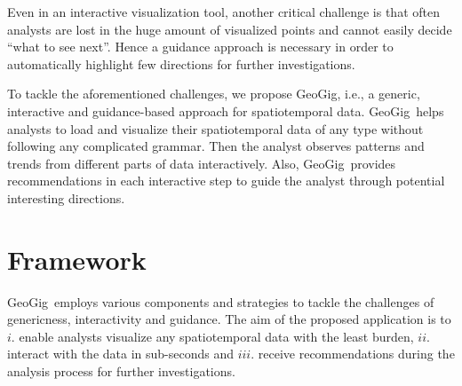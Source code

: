 \documentclass[conference]{IEEEtran}
\newcommand{\sys}{{\sc GeoGig}}
\begin{document}
 Even in an interactive visualization tool, another critical challenge is that often analysts are lost in the huge amount of visualized points and cannot easily decide ``what to see next''. Hence a guidance approach is necessary in order to automatically highlight few directions for further investigations.

To tackle the aforementioned challenges, we propose \sys, i.e., a generic, interactive and guidance-based approach for spatiotemporal data. \sys\ helps analysts to load and visualize their spatiotemporal data of any type without following any complicated grammar. Then the analyst observes patterns and trends from different parts of data interactively. Also, \sys\ provides recommendations in each interactive step to guide the analyst through potential interesting directions.



\vspace{-5pt}
\section{Framework}
\sys\ employs various components and strategies to tackle the challenges of genericness, interactivity and guidance. The aim of the proposed application is to $i.$ enable analysts visualize any spatiotemporal data with the least burden, $ii.$ interact with the data in sub-seconds and $iii.$ receive recommendations during the analysis process for further investigations.
\end{document}
